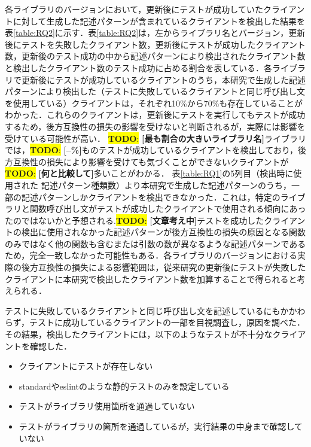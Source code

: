 \documentclass[11pt]{jreport}
\newcommand{\todo}[1]{\colorbox{yellow}{{\bf TODO}:}{\color{red} {\textbf{[#1]}}}}
\begin{document}
各ライブラリのバージョンにおいて，更新後にテストが成功していたクライアントに対して生成した記述パターンが含まれているクライアントを検出した結果を表\ref{table:RQ2}に示す．表\ref{table:RQ2}は，左からライブラリ名とバージョン，更新後にテストを失敗したクライアント数，更新後にテストが成功したクライアント数，更新後のテスト成功の中から記述パターンにより検出されたクライアント数と検出したクライアント数のテスト成功に占める割合を表している．各ライブラリで更新後にテストが成功しているクライアントのうち，本研究で生成した記述パターンにより検出した（テストに失敗しているクライアントと同じ呼び出し文を使用している）クライアントは，それぞれ10\%から70\%も存在していることがわかった．これらのクライアントは，更新後にテストを実行してもテストが成功するため，後方互換性の損失の影響を受けないと判断されるが，実際には影響を受けている可能性が高い．
\todo{最も割合の大きいライブラリ名}ライブラリでは，\todo{--\%}ものテストが成功しているクライアントを検出しており，後方互換性の損失により影響を受けても気づくことができないクライアントが\todo{何と比較して}多いことがわかる．
表\ref{table:RQ1}の5列目（検出時に使用された
記述パターン種類数）より本研究で生成した記述パターンのうち，一部の記述パターンしかクライアントを検出できなかった．これは，特定のライブラリと関数呼び出し文がテストが成功したクライアントで使用される傾向にあったのではないかと予想される.\todo{文章考え中}テストを成功したクライアントの検出に使用されなかった記述パターンが後方互換性の損失の原因となる関数のみではなく他の関数も含むまたは引数の数が異なるような記述パターンであるため，完全一致しなかった可能性もある．各ライブラリのバージョンにおける実際の後方互換性の損失による影響範囲は，従来研究の更新後にテストが失敗したクライアントに本研究で検出したクライアント数を加算することで得られると考えられる．

テストに失敗しているクライアントと同じ呼び出し文を記述しているにもかかわらず，テストに成功しているクライアントの一部を目視調査し，原因を調べた．その結果，検出したクライアントには，以下のようなテストが不十分なクライアントを確認した．

\begin{itemize}
\item クライアントにテストが存在しない
\item standardやeslintのような静的テストのみを設定している
\item テストがライブラリ使用箇所を通過していない
\item テストがライブラリの箇所を通過しているが，実行結果の中身まで確認していない
\end{itemize}
\end{document}

